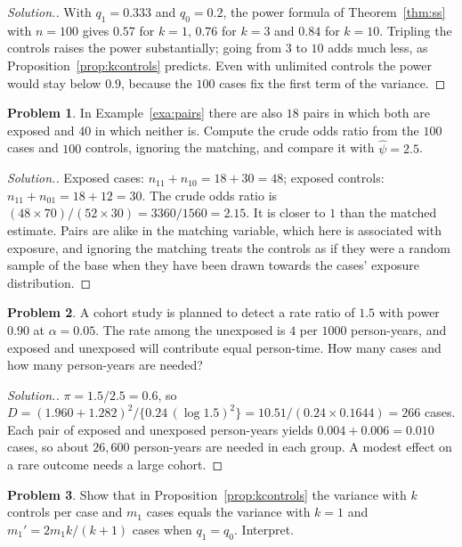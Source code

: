 \documentclass[11pt,a4paper]{article}
\numberwithin{equation}{section}
\theoremstyle{definition}
\newtheorem{problemx}{Problem}[subsection]
\newenvironment{problem}{\begin{problemx}}{\end{problemx}}
\newenvironment{solution}
  {\renewcommand{\qedsymbol}{}\begin{proof}[\textit{Solution}.]}
  {\end{proof}}
\begin{document}
\begin{solution}
With $q_1 = 0.333$ and $q_0 = 0.2$, the power formula of Theorem~\ref{thm:ss} with $n = 100$ gives $0.57$ for $k = 1$, $0.76$ for $k = 3$ and $0.84$ for $k = 10$.
Tripling the controls raises the power substantially; going from $3$ to $10$ adds much less, as Proposition~\ref{prop:kcontrols} predicts.
Even with unlimited controls the power would stay below $0.9$, because the $100$ cases fix the first term of the variance.
\end{solution}

\begin{problem}
In Example~\ref{exa:pairs} there are also $18$ pairs in which both are exposed and $40$ in which neither is. Compute the crude odds ratio from
the $100$ cases and $100$ controls, ignoring the matching, and compare it with $\hat\psi = 2.5$.
\end{problem}

\begin{solution}
Exposed cases: $n_{11} + n_{10} = 18 + 30 = 48$; exposed controls: $n_{11} + n_{01} = 18 + 12 = 30$. The crude odds ratio is
$(48 \times 70)/(52 \times 30) = 3360/1560 = 2.15$. It is closer to $1$ than the matched estimate. Pairs are alike in the matching variable, which here is
associated with exposure, and ignoring the matching treats the controls as if they were a random sample of the base when they have
been drawn towards the cases' exposure distribution.
\end{solution}

\begin{problem}
A cohort study is planned to detect a rate ratio of $1.5$ with power $0.90$ at $\alpha = 0.05$. The rate among the unexposed is $4$ per $1000$
person-years, and exposed and unexposed will contribute equal person-time. How many cases and how many person-years are needed?
\end{problem}

\begin{solution}
$\pi = 1.5/2.5 = 0.6$, so $D = (1.960 + 1.282)^2/\{0.24\,(\log 1.5)^2\} = 10.51/(0.24 \times 0.1644) = 266$ cases. Each pair of exposed and unexposed person-years
yields $0.004 + 0.006 = 0.010$ cases, so about $26{,}600$ person-years are needed in each group. A modest effect on a rare outcome needs a large
cohort.
\end{solution}

\begin{problem}
Show that in Proposition~\ref{prop:kcontrols} the variance with $k$ controls per case and $m_1$ cases equals the variance with $k = 1$ and
$m_1' = 2m_1 k/(k + 1)$ cases when $q_1 = q_0$. Interpret.
\end{problem}
\end{document}
